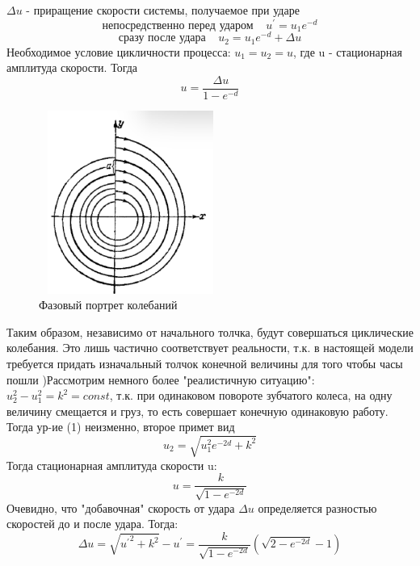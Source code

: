 \documentclass[12pt,a4paper]{article}
\begin{document}
$\Delta{u}$ - приращение скорости системы, получаемое при ударе
\begin{equation}
\text{непосредственно перед ударом} \;\;\;\; u^{'}=u_{1}e^{-d}
\end{equation}
\begin{equation}
\text{сразу после удара} \;\;\;\; u_{2}=u_{1}e^{-d} + \Delta{u}
\end{equation}
Необходимое условие цикличности процесса: $u_{1}=u_{2}=u$, где u - стационарная амплитуда скорости. Тогда
\begin{equation}
u=\frac{\Delta{u}}{1-e^{-d}}
\end{equation}
\begin{figure}[H]
\centering
\includegraphics[width=6cm, height=6cm]{ВПВ_1}
\caption{Фазовый портрет колебаний}
\label{pic:1}
\end{figure}
Таким образом, независимо от начального толчка, будут совершаться циклические колебания. Это лишь частично соответствует реальности, т.к. в настоящей модели требуется придать изначальный толчок конечной величины для того чтобы часы пошли \hfill {})Рассмотрим немного более "реалистичную ситуацию": $u^{2}_{2}-u^{2}_{1}=k^{2}=const$, т.к. при одинаковом повороте зубчатого колеса, на одну величину смещается и груз, то есть совершает конечную одинаковую работу. Тогда ур-ие (1) неизменно, второе примет вид 
\begin{equation}
u_{2}=\sqrt{u^{2}_{1}e^{-2d}+k^{2}}
\end{equation}
Тогда стационарная амплитуда скорости u:
\begin{equation}
u=\frac{k}{\sqrt{1-e^{-2d}}}
\end{equation}
Очевидно, что "добавочная" скорость от удара $\Delta{u}$ определяется разностью скоростей до и после удара. Тогда:
\begin{equation}
\Delta{u}=\sqrt{{u^{'}}^{2}+k^{2}}-u^{'}=\frac{k}{\sqrt{1-e^{-2d}}}(\sqrt{2-e^{-2d}}-1)
\end{equation}
\end{document}
